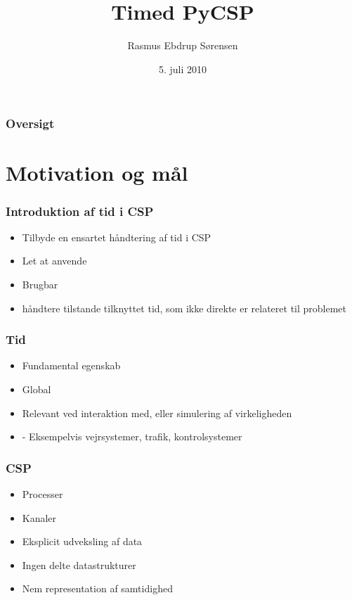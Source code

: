 \documentclass[12pt]{beamer}
\title
{Timed PyCSP}
\institute
{Datalogisk Institut \\ Københavns Universitet}
\author
{Rasmus Ebdrup Sørensen}
\date
{5. juli 2010}
\begin{document}
\frame[plain]\titlepage

\begin{frame}
  \frametitle{Oversigt}
  \tableofcontents
\end{frame}

\section{Motivation og mål}

\begin{frame}
  \frametitle{Introduktion af tid i CSP}
  \begin{itemize}
	\item Tilbyde en ensartet håndtering af tid i CSP
	\item Let at anvende
	\item Brugbar
	\item håndtere tilstande tilknyttet tid, som ikke direkte er relateret til problemet
  \end{itemize}
\end{frame}

\begin{frame}
  \frametitle{Tid}
  \begin{itemize}
	\item Fundamental egenskab
	\item Global
	\item Relevant ved interaktion med, eller simulering af virkeligheden
	\item - Eksempelvis vejrsystemer, trafik, kontrolsystemer 
  \end{itemize}
\end{frame}

\begin{frame}
  \frametitle{CSP}
  \begin{itemize}
	\item Processer
  \item Kanaler
	\item Eksplicit udveksling af data
	\item Ingen delte datastrukturer
  \item Nem representation af samtidighed
 \end{itemize}
\end{frame}

\end{document}
